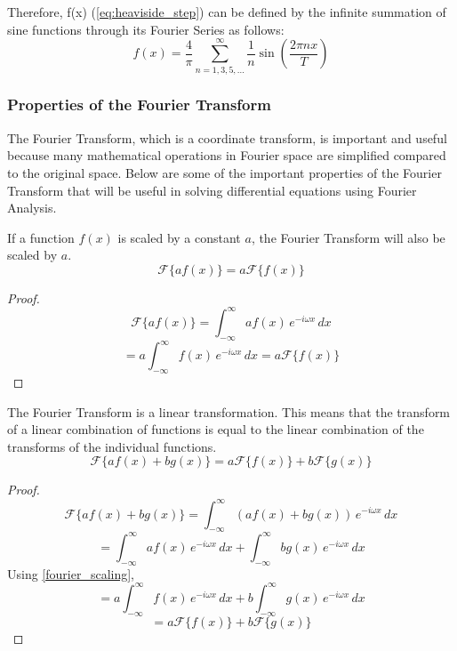 Therefore, f(x) (\cref{eq:heaviside_step}) can be defined by the infinite summation of sine functions through its Fourier Series as follows: 
\[f(x)=\frac{4}{\pi}\sum_{n=1,3,5,...}^{\infty} \frac{1}{n} \sin \left( \frac{2 \pi n x}{T}
 \right) \]

\subsubsection{Properties of the Fourier Transform}
The Fourier Transform, which is a coordinate transform, is important and useful because many mathematical operations in Fourier space are simplified compared to the original space. Below are some of the important properties of the Fourier Transform that will be useful in solving differential equations using Fourier Analysis.
\begin{lemma}
    \label{fourier_scaling}
    If a function \(f(x)\) is scaled by a constant $a$, the Fourier Transform will also be scaled by $a$.
    \begin{equation}
        \mathcal{F}\{ a f(x) \} = a \mathcal{F}\{ f(x) \}
    \end{equation}
\end{lemma}

\begin{proof}
    \[ \mathcal{F}\{ a f(x) \} = \int_{-\infty}^{\infty} a f(x) \, e^{-i \omega x} \,dx \]
    \[ = a \int_{-\infty}^{\infty} f(x) \, e^{-i \omega x} \,dx = a \mathcal{F}\{ f(x) \} \]
\end{proof}


\begin{theorem}
    \label{fourier_linearity}
    The Fourier Transform is a linear transformation. This means that the transform of a linear combination of functions is equal to the linear combination of the transforms of the individual functions.
    \begin{equation}
        \mathcal{F}\{ a f(x) + b g(x) \} = a \mathcal{F}\{ f(x) \} + b \mathcal{F}\{ g(x) \}
    \end{equation}
\end{theorem}
\begin{proof}
    \[ \mathcal{F}\{ a f(x) + b g(x) \} = \int_{-\infty}^{\infty} (a f(x) + b g(x)) \, e^{-i \omega x} \,dx \]
    \[ = \int_{-\infty}^{\infty} a f(x) \, e^{-i \omega x} \,dx + \int_{-\infty}^{\infty} b g(x) \, e^{-i \omega x} \,dx \]
    Using \cref{fourier_scaling},
    \[ = a \int_{-\infty}^{\infty} f(x) \, e^{-i \omega x} \,dx + b \int_{-\infty}^{\infty} g(x) \, e^{-i \omega x} \,dx \]
    \[ = a \mathcal{F}\{ f(x) \} + b \mathcal{F}\{ g(x) \} \]
\end{proof}

